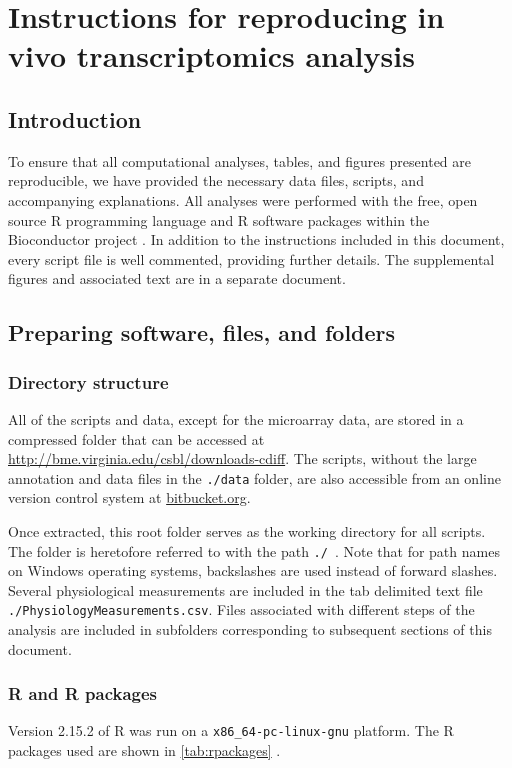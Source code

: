 \chapter[Reproducing in vivo analyses]{Instructions for reproducing in vivo transcriptomics analysis}

\section{Introduction}\label{S:Intro}
To ensure that all computational analyses, tables, and figures
presented are reproducible, we have provided the necessary data
files, scripts, and accompanying explanations. All analyses 
were performed with the free, open source R programming language
and R software packages within the Bioconductor project \cite{Gentleman:2004tt}. 
In addition
to the instructions included in this document, every script file
is well commented, providing further details. The supplemental figures
and associated text are in a separate document. 

\section{Preparing software, files, and folders}\label{S:Files} 

\subsection{Directory structure}
All of the scripts and data, except for the microarray data, are stored 
in a compressed folder that can be accessed at
\url{http://bme.virginia.edu/csbl/downloads-cdiff}. The scripts,
without the large annotation and data files in the \texttt{./data} folder, 
are also accessible from an online version control system at 
\href{https://bitbucket.org/kdauria/cdiff}{bitbucket.org}.

Once extracted, this root folder serves as the working 
directory for all scripts. The folder is heretofore
referred to with the path \texttt{./}~. Note that for path
names on Windows operating systems, backslashes are used instead of
forward slashes. Several physiological measurements are
included in the tab delimited text file
\texttt{./PhysiologyMeasurements.csv}. Files associated with 
different steps of the analysis are included
in subfolders corresponding to subsequent sections of this document.

\subsection{R and R packages}
Version 2.15.2 of R was run on a \texttt{x86\_{}64-pc-linux-gnu} platform. 
The R packages used are shown in \autoref{tab:rpackages} \cite{Gautier:2004kv,Bolstad:2003ia,Durinck:2009ki,Wickham:2009ft,Smyth:2005ht,Wickham:2007tu}.

